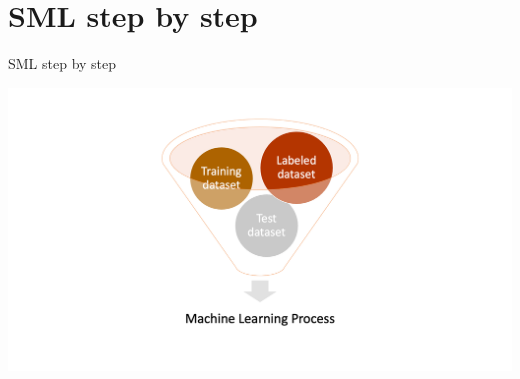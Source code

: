 \documentclass[handout]{beamer}
\begin{document}
\section{SML step by step}

\begin{frame}{SML step by step}
	
	\begin{center}
		\includegraphics{../pictures/MLingredients.png} \\\
	\end{center}
	
	
	
\end{frame}
\end{document}
